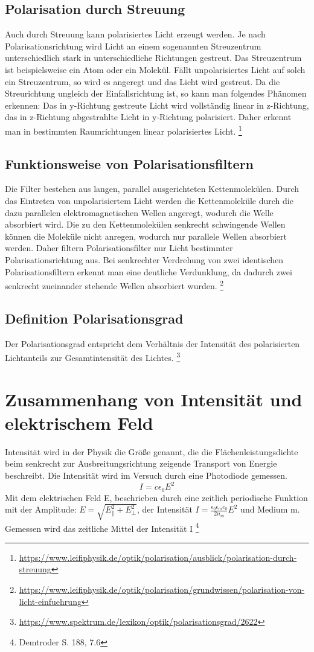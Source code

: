 \subsection*{Polarisation durch Streuung}
Auch durch Streuung kann polarisiertes Licht erzeugt werden. Je nach Polarisationsrichtung wird Licht an einem sogenannten Streuzentrum unterschiedlich stark in unterschiedliche Richtungen gestreut. Das Streuzentrum ist beispielsweise ein Atom oder ein Molekül. Fällt unpolarisiertes Licht auf solch ein Streuzentrum, so wird es angeregt und das Licht wird gestreut. Da die Streurichtung ungleich der Einfallsrichtung ist, so kann man folgendes Phänomen erkennen:  Das in y-Richtung gestreute Licht wird vollständig linear in z-Richtung, das in z-Richtung abgestrahlte Licht in y-Richtung polarisiert. Daher erkennt man in bestimmten Raumrichtungen linear polarisiertes Licht.
\footnote{\url{https://www.leifiphysik.de/optik/polarisation/ausblick/polarisation-durch-streuung}}

\subsection*{Funktionsweise von Polarisationsfiltern}
Die Filter bestehen aus langen, parallel ausgerichteten Kettenmolekülen. Durch das Eintreten von unpolarisiertem Licht werden die Kettenmoleküle durch die dazu parallelen elektromagnetischen Wellen angeregt, wodurch die Welle absorbiert wird. Die zu den Kettenmolekülen senkrecht schwingende Wellen können die Moleküle nicht anregen, wodurch nur parallele Wellen absorbiert werden. Daher filtern Polarisationsfilter nur Licht bestimmter Polarisationsrichtung aus. 
Bei senkrechter Verdrehung von zwei identischen Polarisationsfiltern erkennt man eine deutliche Verdunklung, da dadurch zwei senkrecht zueinander stehende Wellen absorbiert wurden. 
\footnote{\url{https://www.leifiphysik.de/optik/polarisation/grundwissen/polarisation-von-licht-einfuehrung}}

\subsection*{Definition Polarisationsgrad}
Der Polarisationsgrad entspricht dem Verhältnis der Intensität des polarisierten Lichtanteils zur Gesamtintensität des Lichtes.
\footnote{\url{https://www.spektrum.de/lexikon/optik/polarisationsgrad/2622}}
\newpage
\section{Zusammenhang von Intensität und elektrischem Feld}
Intensität wird in der Physik die Größe genannt, die die Flächenleistungsdichte beim senkrecht zur Ausbreitungsrichtung zeigende Transport von Energie beschreibt. 
Die Intensität wird im Versuch durch eine Photodiode gemessen. 
\begin{equation}
I=c\epsilon_0 E^2
\end{equation}
Mit dem elektrischen Feld E, beschrieben durch eine zeitlich periodische Funktion mit der Amplitude: $E=\sqrt{E_{\parallel}^2 +E^2_{\perp}}$, der Intensität $I=\frac{\epsilon_0\epsilon_mc_0}{2n_m}E^2$ und Medium m.
Gemessen wird das zeitliche Mittel der Intensität I
\footnote{Demtroder S. 188, 7.6}

